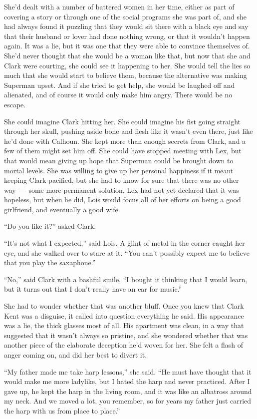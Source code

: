 She'd dealt with a number of battered women in her time, either as part
of covering a story or through one of the social programs she was part
of, and she had always found it puzzling that they would sit there with
a black eye and say that their husband or lover had done nothing wrong,
or that it wouldn't happen again. It was a lie, but it was one that they
were able to convince themselves of. She'd never thought that she would
be a woman like that, but now that she and Clark were courting, she
could see it happening to her. She would tell the lies so much that she
would start to believe them, because the alternative was making Superman
upset. And if she tried to get help, she would be laughed off and
alienated, and of course it would only make him angry. There would be no
escape.

She could imagine Clark hitting her. She could imagine his fist going
straight through her skull, pushing aside bone and flesh like it wasn't
even there, just like he'd done with Calhoun. She kept more than enough
secrets from Clark, and a few of them might set him off. She could have
stopped meeting with Lex, but that would mean giving up hope that
Superman could be brought down to mortal levels. She was willing to give
up her personal happiness if it meant keeping Clark pacified, but she
had to know for sure that there was no other way~--- some more permanent
solution. Lex had not yet declared that it was hopeless, but when he
did, Lois would focus all of her efforts on being a good girlfriend, and
eventually a good wife.

``Do you like it?'' asked Clark.

``It's not what I expected,'' said Lois. A glint of metal in the corner
caught her eye, and she walked over to stare at it. ``You can't possibly
expect me to believe that you play the saxaphone.''

``No,'' said Clark with a bashful smile. ``I bought it thinking that I
would learn, but it turns out that I don't really have an ear for
music.''

She had to wonder whether that was another bluff. Once you knew that
Clark Kent was a disguise, it called into question everything he said.
His appearance was a lie, the thick glasses most of all. His apartment
was clean, in a way that suggested that it wasn't always so pristine,
and she wondered whether that was another piece of the elaborate
deception he'd woven for her. She felt a flash of anger coming on, and
did her best to divert it.

``My father made me take harp lessons,'' she said. ``He must have
thought that it would make me more ladylike, but I hated the harp and
never practiced. After I gave up, he kept the harp in the living room,
and it was like an albatross around my neck. And we moved a lot, you
remember, so for years my father just carried the harp with us from
place to place.''

